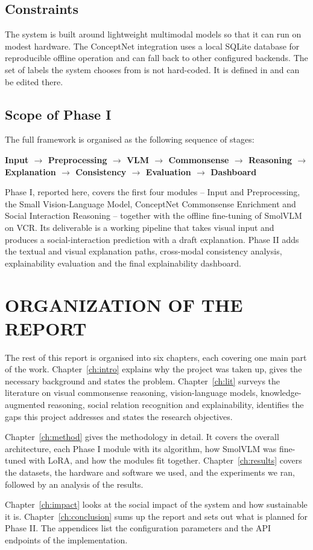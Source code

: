 \subsection{Constraints}
The system is built around lightweight multimodal models so that it can run on modest hardware. The ConceptNet integration uses a local SQLite database for reproducible offline operation and can fall back to other configured backends. The set of labels the system chooses from is not hard-coded. It is defined in  and can be edited there.

\subsection{Scope of Phase I}
The full framework is organised as the following sequence of stages:
\begin{center}
\small\textbf{Input $\rightarrow$ Preprocessing $\rightarrow$ VLM $\rightarrow$ Commonsense $\rightarrow$ Reasoning $\rightarrow$ Explanation $\rightarrow$ Consistency $\rightarrow$ Evaluation $\rightarrow$ Dashboard}
\end{center}
Phase I, reported here, covers the first four modules -- Input and Preprocessing, the Small Vision-Language Model, ConceptNet Commonsense Enrichment and Social Interaction Reasoning -- together with the offline fine-tuning of SmolVLM on VCR. Its deliverable is a working pipeline that takes visual input and produces a social-interaction prediction with a draft explanation. Phase II adds the textual and visual explanation paths, cross-modal consistency analysis, explainability evaluation and the final explainability dashboard.

\section{ORGANIZATION OF THE REPORT}

The rest of this report is organised into six chapters, each covering one main part of the work. Chapter~\ref{ch:intro} explains why the project was taken up, gives the necessary background and states the problem. Chapter~\ref{ch:lit} surveys the literature on visual commonsense reasoning, vision-language models, knowledge-augmented reasoning, social relation recognition and explainability, identifies the gaps this project addresses and states the research objectives.

Chapter~\ref{ch:method} gives the methodology in detail. It covers the overall architecture, each Phase I module with its algorithm, how SmolVLM was fine-tuned with LoRA, and how the modules fit together. Chapter~\ref{ch:results} covers the datasets, the hardware and software we used, and the experiments we ran, followed by an analysis of the results.

Chapter~\ref{ch:impact} looks at the social impact of the system and how sustainable it is. Chapter~\ref{ch:conclusion} sums up the report and sets out what is planned for Phase II. The appendices list the configuration parameters and the API endpoints of the implementation.
